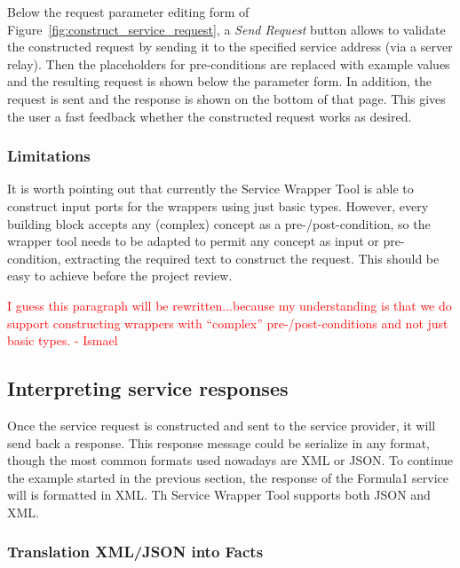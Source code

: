 \documentclass{fast_latex}
\begin{document}
{Below the request parameter editing form of Figure~\ref{fig:construct_service_request}, a \textit{Send Request} button allows to validate the constructed request by sending it to the specified service address (via a server relay). Then the placeholders for pre-conditions are replaced with example values and the resulting request is shown below the parameter form. In addition, the request is sent and the response is shown on the bottom of that page. This gives the user a fast feedback whether the constructed request works as desired. 

\subsubsection{Limitations} %
\label{ssub:limitations}

It is worth pointing out that currently the Service Wrapper Tool is able to construct input ports for the wrappers using just basic types. However, every building block accepts any (complex) concept as a pre-/post-condition, so the wrapper tool needs to be adapted to permit any concept as input or pre-condition, extracting the required text to construct the request. This should be easy to achieve before the project review. 

\textcolor{red}{I guess this paragraph will be rewritten...because my understanding is that we do support constructing wrappers with ``complex'' pre-/post-conditions and not just basic types. - Ismael}



\subsection{Interpreting service responses} %
\label{sub:interpreting_service_responses}

Once the service request is constructed and sent to the service provider, it will send back a response. This response message could be serialize in any format, though the most common formats used nowadays are XML or JSON. To continue the example started in the previous section, the response of the Formula1 service will is formatted in XML. Th Service Wrapper Tool supports both JSON and XML.

\subsubsection{Translation XML/JSON into Facts} %
\label{ssub:translation_xml_into_facts}

}
\end{document}
